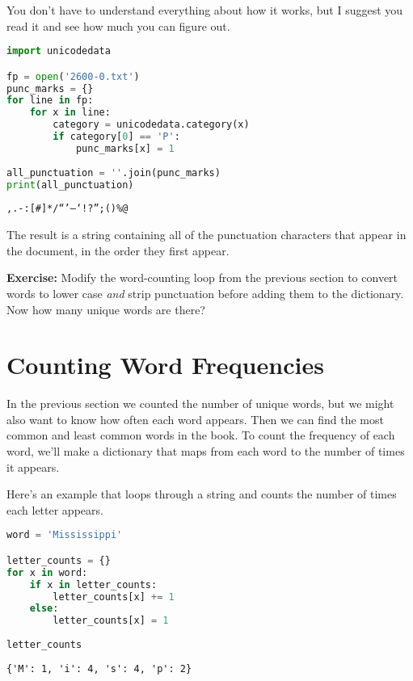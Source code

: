 You don't have to understand everything about how it works, but I
suggest you read it and see how much you can figure out.

\begin{lstlisting}[language=Python,style=source]
import unicodedata

fp = open('2600-0.txt')
punc_marks = {}
for line in fp:
    for x in line:
        category = unicodedata.category(x)
        if category[0] == 'P':
            punc_marks[x] = 1
        
all_punctuation = ''.join(punc_marks)
print(all_punctuation)
\end{lstlisting}

\begin{lstlisting}[style=output]
,.-:[#]*/“’—‘!?”;()%@
\end{lstlisting}

The result is a string containing all of the punctuation characters that
appear in the document, in the order they first appear.

\textbf{Exercise:} Modify the word-counting loop from the previous
section to convert words to lower case \emph{and} strip punctuation
before adding them to the dictionary. Now how many unique words are
there?

\section{Counting Word Frequencies}\label{counting-word-frequencies}

In the previous section we counted the number of unique words, but we
might also want to know how often each word appears. Then we can find
the most common and least common words in the book. To count the
frequency of each word, we'll make a dictionary that maps from each word
to the number of times it appears.

Here's an example that loops through a string and counts the number of
times each letter appears.

\begin{lstlisting}[language=Python,style=source]
word = 'Mississippi'

letter_counts = {}
for x in word:
    if x in letter_counts:
        letter_counts[x] += 1
    else:
        letter_counts[x] = 1
        
letter_counts
\end{lstlisting}

\begin{lstlisting}[style=output]
{'M': 1, 'i': 4, 's': 4, 'p': 2}
\end{lstlisting}

